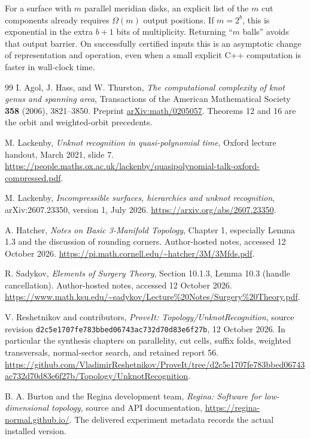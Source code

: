\documentclass[11pt,a4paper]{article}
\theoremstyle{definition}
\begin{document}
For a surface with $m$ parallel meridian disks, an explicit list of the $m$
cut components already requires $\Omega(m)$ output positions.  If $m=2^b$,
this is exponential in the extra $b+1$ bits of multiplicity.  Returning
``$m$ balls'' avoids that output barrier.  On successfully certified inputs
this is an asymptotic change of representation and operation, even when a
small explicit C++ computation is faster in wall-clock time.






\begin{thebibliography}{99}
I. Agol, J. Hass, and W. Thurston,
\emph{The computational complexity of knot genus and spanning area},
Transactions of the American Mathematical Society \textbf{358} (2006),
3821--3850.  Preprint \href{https://arxiv.org/abs/math/0205057}{arXiv:math/0205057}.
Theorems 12 and 16 are the orbit and weighted-orbit precedents.

M. Lackenby, \emph{Unknot recognition in quasi-polynomial time},
Oxford lecture handout, March 2021, slide 7.
\url{https://people.maths.ox.ac.uk/lackenby/quasipolynomial-talk-oxford-compressed.pdf}.

M. Lackenby, \emph{Incompressible surfaces, hierarchies and unknot recognition},
arXiv:2607.23350, version 1, July 2026.
\url{https://arxiv.org/abs/2607.23350}.

A. Hatcher, \emph{Notes on Basic 3-Manifold Topology},
Chapter 1, especially Lemma 1.3 and the discussion of rounding corners.
Author-hosted notes, accessed 12 October 2026.
\url{https://pi.math.cornell.edu/~hatcher/3M/3Mfds.pdf}.

R. Sadykov, \emph{Elements of Surgery Theory},
Section 10.1.3, Lemma 10.3 (handle cancellation).
Author-hosted notes, accessed 12 October 2026.
\url{https://www.math.ksu.edu/~sadykov/Lecture%20Notes/Surgery%20Theory.pdf}.

V. Reshetnikov and contributors, \emph{ProveIt: Topology/UnknotRecognition},
source revision \texttt{d2c5e1707fe783bbed06743ac732d70d83e6f27b},
12 October 2026.  In particular the synthesis chapters on parallelity,
cut cells, suffix folds, weighted transversals, normal-sector search,
and retained report 56.
\url{https://github.com/VladimirReshetnikov/ProveIt/tree/d2c5e1707fe783bbed06743ac732d70d83e6f27b/Topology/UnknotRecognition}.

B. A. Burton and the Regina development team,
\emph{Regina: Software for low-dimensional topology},
source and API documentation, \url{https://regina-normal.github.io/}.
The delivered experiment metadata records the actual installed version.
\end{thebibliography}
\end{document}
